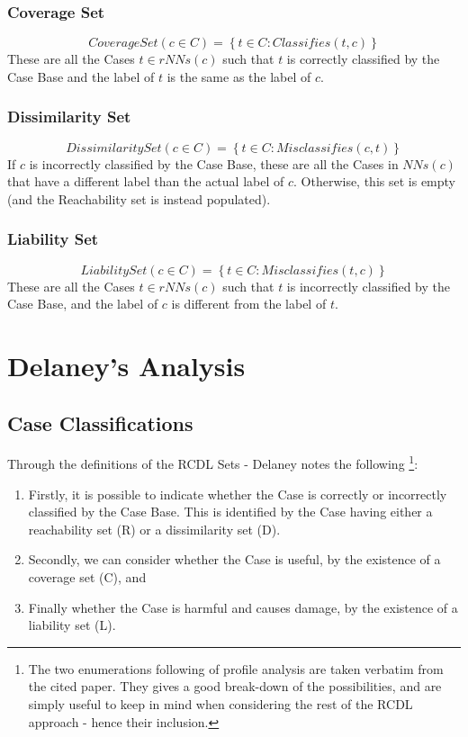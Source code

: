 \documentclass[a4paper,11pt]{report}
\begin{document}
\subsubsection{Coverage Set}
\[ CoverageSet(c \in C) = \left\lbrace t \in C : Classifies(t, c) \right\rbrace \]
These are all the Cases $ t \in rNNs(c) $ such that $t$ is correctly classified by the Case Base and the label of $t$ is the same as the label of $c$.

\subsubsection{Dissimilarity Set}
\[ DissimilaritySet(c \in C) = \left\lbrace t \in C : Misclassifies(c, t) \right\rbrace \]  
If $c$ is incorrectly classified by the Case Base, these are all the Cases in $ NNs(c) $ that have a different label than the actual label of $c$. Otherwise, this set is empty (and the Reachability set is instead populated).

\subsubsection{Liability Set}
\[ LiabilitySet(c \in C) = \left\lbrace t \in C : Misclassifies(t, c) \right\rbrace \]  
These are all the Cases $ t \in rNNs(c) $ such that $t$ is incorrectly classified by the Case Base, and the label of $c$ is different from the label of $t$.

\section{Delaney's Analysis}

\subsection{Case Classifications}
Through the definitions of the RCDL Sets - Delaney notes the following \citep{Delany2009}\footnote{The two enumerations following of profile analysis are taken verbatim from the cited paper. They gives a good break-down of the possibilities, and are simply useful to keep in mind when considering the rest of the RCDL approach - hence their inclusion.}:

\begin{enumerate}
	\item Firstly, it is possible to indicate whether the Case is correctly or incorrectly classified by the Case Base. This is identified by the Case having either a reachability set (R) or a dissimilarity set (D).
	\item Secondly, we can consider whether the Case is useful, by the existence of a coverage set (C), and
	\item Finally whether the Case is harmful and causes damage, by the existence of a liability set (L).
\end{enumerate}
\end{document}
